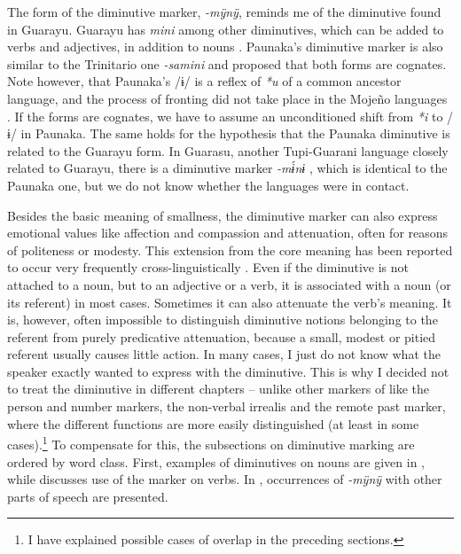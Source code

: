 \largerpage
The form of the diminutive marker, \textit{-mÿnÿ}, reminds me of the diminutive found in Guarayu. Guarayu has \textit{mini} among other diminutives, which can be added to verbs and adjectives, in addition to nouns \citep[13]{Hoeller1932a}. Paunaka’s diminutive marker is also similar to the Trinitario one \textit{-samini} and \citet[174--175]{Rose2018} proposed that both forms are cognates. Note however, that Paunaka’s /ɨ/ is a reflex of \textit{*u} of a common ancestor language, and the process of fronting did not take place in the Mojeño languages \citep[cf.][418]{deCarvalhoPAU}. If the forms are cognates, we have to assume an unconditioned shift from \textit{*i} to /ɨ/ in Paunaka. The same holds for the hypothesis that the Paunaka diminutive is related to the Guarayu form. In Guarasu, another Tupi-Guarani language closely related to Guarayu, there is a diminutive marker \textit{-m\'{ɨ}nɨ} \citep[437]{RamirezAL2017}, which is identical to the Paunaka one, but we do not know whether the languages were in contact.

Besides the basic meaning of smallness, the diminutive marker can also express emotional values like affection and compassion and attenuation, often for reasons of politeness or modesty. This extension from the core meaning has been reported to occur very frequently cross-linguistically \citep[535, 558]{Jurafsky1996}. Even if the diminutive is not attached to a noun, but to an adjective or a verb, it is associated with a noun (or its referent) in most cases. Sometimes it can also attenuate the verb’s meaning. It is, however, often impossible to distinguish diminutive notions belonging to the referent from purely predicative attenuation, because a small, modest or pitied referent usually causes little action. In many cases, I just do not know what the speaker exactly wanted to express with the diminutive. This is why I decided not to treat the diminutive in different chapters -- unlike other markers of  like the person and number markers, the non-verbal irrealis and the remote past marker, where the different functions are more easily distinguished (at least in some cases).\footnote{I have explained possible cases of overlap in the preceding sections.} To compensate for this, the subsections on diminutive marking are ordered by word class. First, examples of diminutives on nouns are given in , while  discusses use of the marker on verbs. In , occurrences of \textit{-mÿnÿ} with other parts of speech are presented.

